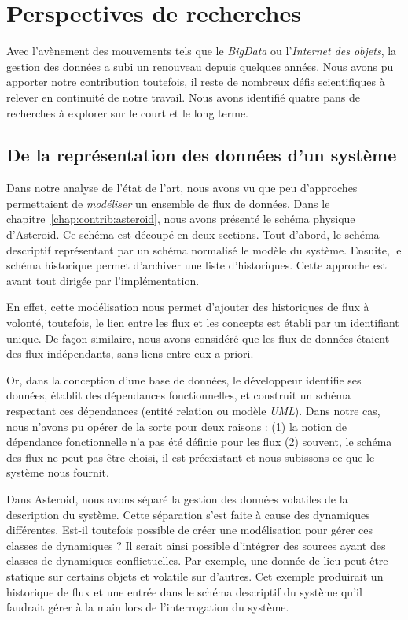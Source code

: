 \section{Perspectives de recherches}\label{sec:conclusion:perspectives}
Avec l'avènement des mouvements tels que le \textit{BigData} ou l'\textit{Internet des objets}, la gestion des données a subi un renouveau depuis quelques années. Nous avons pu apporter notre contribution toutefois, il reste de nombreux défis scientifiques à relever en continuité de notre travail. Nous avons identifié quatre pans de recherches à explorer sur le court et le long terme.

\subsection{De la représentation des données d'un système}
Dans notre analyse de l'état de l'art, nous avons vu que peu d'approches permettaient de \textit{modéliser} un ensemble de flux de données. Dans le chapitre~\ref{chap:contrib:asteroid}, nous avons présenté le schéma physique d'Asteroid. Ce schéma est découpé en deux sections. Tout d'abord, le schéma descriptif représentant par un schéma normalisé le modèle du système. Ensuite, le schéma historique permet d'archiver une liste d'historiques. Cette approche est avant tout dirigée par l'implémentation.

En effet, cette modélisation nous permet d'ajouter des historiques de flux à volonté, toutefois, le lien entre les flux et les concepts est établi par un identifiant unique. De façon similaire, nous avons considéré que les flux de données étaient des flux indépendants, sans liens entre eux a priori.

Or, dans la conception d'une base de données, le développeur identifie ses données, établit des dépendances fonctionnelles, et construit un schéma respectant ces dépendances (entité relation ou modèle \textit{UML}). Dans notre cas, nous n'avons pu opérer de la sorte pour deux raisons : (1) la notion de dépendance fonctionnelle n'a pas été définie pour les flux (2) souvent, le schéma des flux ne peut pas être choisi, il est préexistant et nous subissons ce que le système nous fournit.

Dans Asteroid, nous avons séparé la gestion des données volatiles de la description du système. Cette séparation s'est faite à cause des dynamiques différentes. Est-il toutefois possible de créer une modélisation pour gérer ces classes de dynamiques ? Il serait ainsi possible d'intégrer des sources ayant des classes de dynamiques conflictuelles. Par exemple, une donnée de lieu peut être statique sur certains objets et volatile sur d'autres. Cet exemple produirait un historique de flux et une entrée dans le schéma descriptif du système qu'il faudrait gérer à la main lors de l'interrogation du système.

